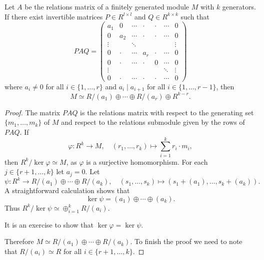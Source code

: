 \begin{proposition}
	Let $A$ be the relations matrix of a finitely generated module $M$ with $k$ generators. 
	If there exist invertible matrices $P\in R^{l\times l}$ 
	and $Q\in R^{k\times k}$ such that 
	\[
		PAQ=
		\begin{pmatrix}
			a_1 & 0 & \cdots & \cdot & \cdot & \cdots & 0\\
			0 & a_2 & \cdots & \cdot & \cdot & \cdots & 0\\
			\vdots && \ddots &  & & & \vdots\\	
			0 & \cdot & \cdots & a_r & \cdot & \cdots & 0\\	
			0 & \cdot & \cdots & \cdot & 0 & \cdots & 0\\	
			\vdots &&&&&\ddots &\vdots\\
			0 & \cdot & \cdots & \cdot & \cdot & \cdots & 0
		\end{pmatrix}
	\]
	where $a_i\ne0$ for all $i\in\{1,\dots,r\}$ and  $a_i\mid a_{i+1}$ for all
	$i\in\{1,\dots,r-1\}$,  then 
	\[
		M\simeq R/(a_1)\oplus\cdots\oplus R/(a_r)\oplus R^{k-r}.
	\]
\end{proposition}

\begin{proof}
	The matrix $PAQ$ is the relations matrix with respect to 
	the generating set $\{m_1,\dots,m_k\}$ of $M$ and respect to the relations submodule 
	given by the rows of $PAQ$.  If 
    \[ 
    \varphi\colon R^k\to M,\quad 
    (r_1,\dots,r_k)\mapsto \sum_{i=1}^k r_i\cdot m_i,
    \]
    then 
	$R^k/\ker\varphi\simeq M$, as $\varphi$ is a surjective homomorphism. For each 
	$j\in\{r+1,\dots,k\}$ let $a_j=0$.  Let 
	\[
		\psi\colon R^k\to R/(a_1)\oplus\cdots\oplus R/(a_k),\quad
		(s_1,\dots,s_k)\mapsto (s_1+(a_1),\dots,s_k+(a_k)). 
	\]
	A straightforward calculation shows that 
	\[
		\ker\psi=(a_1)\oplus\cdots\oplus (a_k).
	\]
	Thus 
	$R^k/\ker\psi\simeq \oplus_{i=1}^k R/(a_i)$. 
	
	It is an exercise to show that $\ker\varphi=\ker\psi$. 
	

	Therefore $M\simeq R/(a_1)\oplus\cdots\oplus R/(a_k)$. To finish the proof
	we need to note that $R/(a_i)\simeq R$ for all $i\in\{r+1,\dots,k\}$. 
\end{proof}


